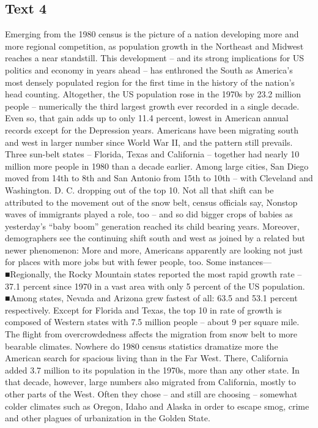 \subsection{Text 4}
Emerging from the 1980 census is the picture of a nation developing more and more regional competition, as population growth in the Northeast and Midwest reaches a near standstill.
This development -- and its strong implications for US politics and economy in years ahead -- has enthroned the South as America’s most densely populated region for the first time in the history of the nation’s head counting.
Altogether, the US population rose in the 1970s by 23.2 million people -- numerically the third largest growth ever recorded in a single decade. Even so, that gain adds up to only 11.4 percent, lowest in American annual records except for the Depression years.
Americans have been migrating south and west in larger number since World War II, and the pattern still prevails.
Three sun-belt states -- Florida, Texas and California -- together had nearly 10 million more people in 1980 than a decade earlier. Among large cities, San Diego moved from 14th to 8th and San Antonio from 15th to 10th -- with Cleveland and Washington. D. C. dropping out of the top 10.
Not all that shift can be attributed to the movement out of the snow belt, census officials say, Nonstop waves of immigrants played a role, too -- and so did bigger crops of babies as yesterday’s “baby boom” generation reached its child bearing years.
Moreover, demographers see the continuing shift south and west as joined by a related but newer phenomenon: More and more, Americans apparently are looking not just for places with more jobs but with fewer people, too. Some instances—
■Regionally, the Rocky Mountain states reported the most rapid growth rate -- 37.1 percent since 1970 in a vast area with only 5 percent of the US population.
■Among states, Nevada and Arizona grew fastest of all: 63.5 and 53.1 percent respectively. Except for Florida and Texas, the top 10 in rate of growth is composed of Western states with 7.5 million people -- about 9 per square mile.
The flight from overcrowdedness affects the migration from snow belt to more bearable climates.
Nowhere do 1980 census statistics dramatize more the American search for spacious living than in the Far West. There, California added 3.7 million to its population in the 1970s, more than any other state.
In that decade, however, large numbers also migrated from California, mostly to other parts of the West. Often they chose -- and still are choosing -- somewhat colder climates such as Oregon, Idaho and Alaska in order to escape smog, crime and other plagues of urbanization in the Golden State.
